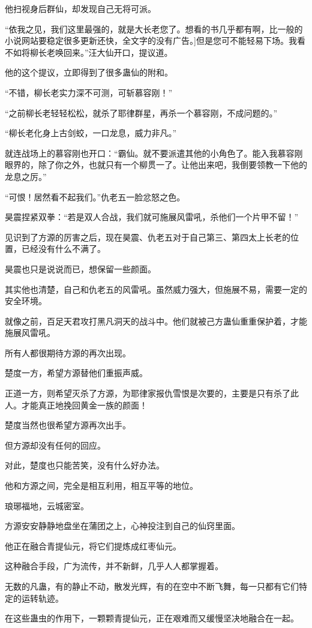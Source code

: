 \begin{this_body}
他扫视身后群仙，却发现自己无将可派。

“依我之见，我们这里最强的，就是大长老您了。想看的书几乎都有啊，比一般的小说网站要稳定很多更新还快，全文字的没有广告。]但是您可不能轻易下场。我看不如将柳长老唤回来。”汪大仙开口，提议道。

他的这个提议，立即得到了很多蛊仙的附和。

“不错，柳长老实力深不可测，可斩慕容刚！”

“之前柳长老轻轻松松，就杀了耶律群星，再杀一个慕容刚，不成问题的。”

“柳长老化身上古剑蛟，一口龙息，威力非凡。”

就连战场上的慕容刚也开口：“霸仙。就不要派遣其他的小角色了。能入我慕容刚眼界的，除了你之外，也就只有一个柳贯一了。让他出来吧，我倒要领教一下他的龙息之厉。”

“可恨！居然看不起我们。”仇老五一脸忿怒之色。

昊震捏紧双拳：“若是双人合战，我们就可施展风雷吼，杀他们一个片甲不留！”

见识到了方源的厉害之后，现在昊震、仇老五对于自己第三、第四太上长老的位置，已经没有什么不满了。

昊震也只是说说而已，想保留一些颜面。

其实他也清楚，自己和仇老五的风雷吼。虽然威力强大，但施展不易，需要一定的安全环境。

就像之前，百足天君攻打黑凡洞天的战斗中。他们就被己方蛊仙重重保护着，才能施展风雷吼。

所有人都很期待方源的再次出现。

楚度一方，希望方源替他们重振声威。

正道一方，则希望灭杀了方源，为耶律家报仇雪恨是次要的，主要是只有杀了此人。才能真正地挽回黄金一族的颜面！

楚度当然也很希望方源再次出手。

但方源却没有任何的回应。

对此，楚度也只能苦笑，没有什么好办法。

他和方源之间，完全是相互利用，相互平等的地位。

琅琊福地，云城密室。

方源安安静静地盘坐在蒲团之上，心神投注到自己的仙窍里面。

他正在融合青提仙元，将它们提炼成红枣仙元。

这种融合手段，广为流传，并不新鲜，几乎人人都掌握着。

无数的凡蛊，有的静止不动，散发光辉，有的在空中不断飞舞，每一只都有它们特定的运转轨迹。

在这些蛊虫的作用下，一颗颗青提仙元，正在艰难而又缓慢坚决地融合在一起。


\end{this_body}
